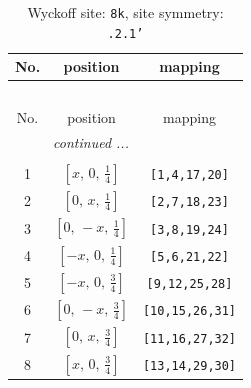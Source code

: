 \documentclass[fleqn,8pt]{jsarticle}
\begin{document}
\begin{longtable}{ccc}
\caption{Wyckoff site: {\tt 8k}, site symmetry: {\tt .2.1'}}
 \\
 \hline \hline
No. & position & mapping \\ \hline \endfirsthead

\multicolumn{2}{l}{\tablename\ \thetable{}} \\
 \hline \hline
No. & position & mapping \\ \hline \endhead

 \hline \hline
\multicolumn{2}{r}{\footnotesize\it continued ...} \\ \endfoot

 \hline \hline
\multicolumn{2}{r}{} \\ \endlastfoot

1 & $\left[ x,\, 0,\, \frac{1}{4} \right]$ & {\tt [1,4,17,20]} \\ \hline
2 & $\left[ 0,\, x,\, \frac{1}{4} \right]$ & {\tt [2,7,18,23]} \\ \hline
3 & $\left[ 0,\, - x,\, \frac{1}{4} \right]$ & {\tt [3,8,19,24]} \\ \hline
4 & $\left[ - x,\, 0,\, \frac{1}{4} \right]$ & {\tt [5,6,21,22]} \\ \hline
5 & $\left[ - x,\, 0,\, \frac{3}{4} \right]$ & {\tt [9,12,25,28]} \\ \hline
6 & $\left[ 0,\, - x,\, \frac{3}{4} \right]$ & {\tt [10,15,26,31]} \\ \hline
7 & $\left[ 0,\, x,\, \frac{3}{4} \right]$ & {\tt [11,16,27,32]} \\ \hline
8 & $\left[ x,\, 0,\, \frac{3}{4} \right]$ & {\tt [13,14,29,30]} \\
\end{longtable}
\renewcommand{\arraystretch}{1.2}
\end{document}
